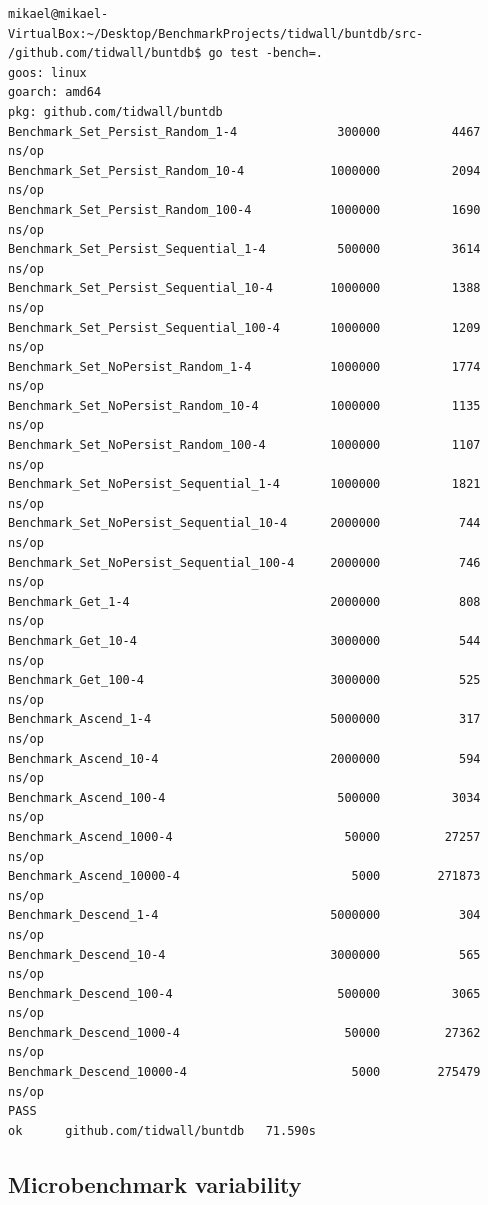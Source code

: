 \documentclass{seal_thesis}
\begin{document}
\begin{lstlisting}[caption=Example microbenchmark suite execution from tidwall/buntdb \cite{tidwall/buntdb}., label={testbench}, frame=single, breaklines=false]
mikael@mikael-VirtualBox:~/Desktop/BenchmarkProjects/tidwall/buntdb/src-
/github.com/tidwall/buntdb$ go test -bench=.
goos: linux
goarch: amd64
pkg: github.com/tidwall/buntdb
Benchmark_Set_Persist_Random_1-4           	  300000	      4467 ns/op
Benchmark_Set_Persist_Random_10-4          	 1000000	      2094 ns/op
Benchmark_Set_Persist_Random_100-4         	 1000000	      1690 ns/op
Benchmark_Set_Persist_Sequential_1-4       	  500000	      3614 ns/op
Benchmark_Set_Persist_Sequential_10-4      	 1000000	      1388 ns/op
Benchmark_Set_Persist_Sequential_100-4     	 1000000	      1209 ns/op
Benchmark_Set_NoPersist_Random_1-4         	 1000000	      1774 ns/op
Benchmark_Set_NoPersist_Random_10-4        	 1000000	      1135 ns/op
Benchmark_Set_NoPersist_Random_100-4       	 1000000	      1107 ns/op
Benchmark_Set_NoPersist_Sequential_1-4     	 1000000	      1821 ns/op
Benchmark_Set_NoPersist_Sequential_10-4    	 2000000	       744 ns/op
Benchmark_Set_NoPersist_Sequential_100-4   	 2000000	       746 ns/op
Benchmark_Get_1-4                          	 2000000	       808 ns/op
Benchmark_Get_10-4                         	 3000000	       544 ns/op
Benchmark_Get_100-4                        	 3000000	       525 ns/op
Benchmark_Ascend_1-4                       	 5000000	       317 ns/op
Benchmark_Ascend_10-4                      	 2000000	       594 ns/op
Benchmark_Ascend_100-4                     	  500000	      3034 ns/op
Benchmark_Ascend_1000-4                    	   50000	     27257 ns/op
Benchmark_Ascend_10000-4                   	    5000	    271873 ns/op
Benchmark_Descend_1-4                      	 5000000	       304 ns/op
Benchmark_Descend_10-4                     	 3000000	       565 ns/op
Benchmark_Descend_100-4                    	  500000	      3065 ns/op
Benchmark_Descend_1000-4                   	   50000	     27362 ns/op
Benchmark_Descend_10000-4                  	    5000	    275479 ns/op
PASS
ok  	github.com/tidwall/buntdb	71.590s
\end{lstlisting}


\subsection{Microbenchmark variability}
\label{Microbenchmark variability}
\end{document}
